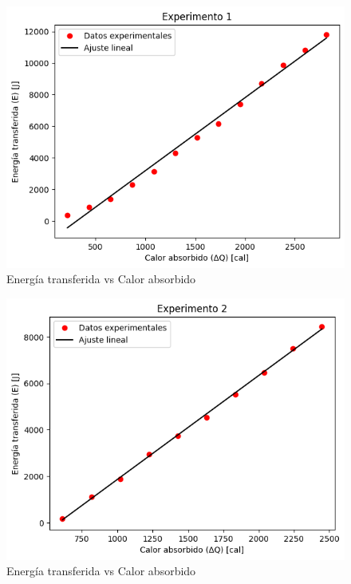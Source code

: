 \documentclass[10pt]{article}
\begin{document}
\begin{multicols*}{2}
\begin{figure}[H]
    \centering
    \includegraphics[scale=0.45]{exp1.png}
    \caption{Energía transferida vs Calor absorbido}
    \label{datos1}
\end{figure}
\begin{figure}[H]
    \centering
    \includegraphics[scale=0.45]{exp2.png}
    \caption{Energía transferida vs Calor absorbido}
    \label{datos2}
\end{figure}
\begin{figure}[H]
    \centering

\end{figure}
\end{multicols*}
\end{document}
